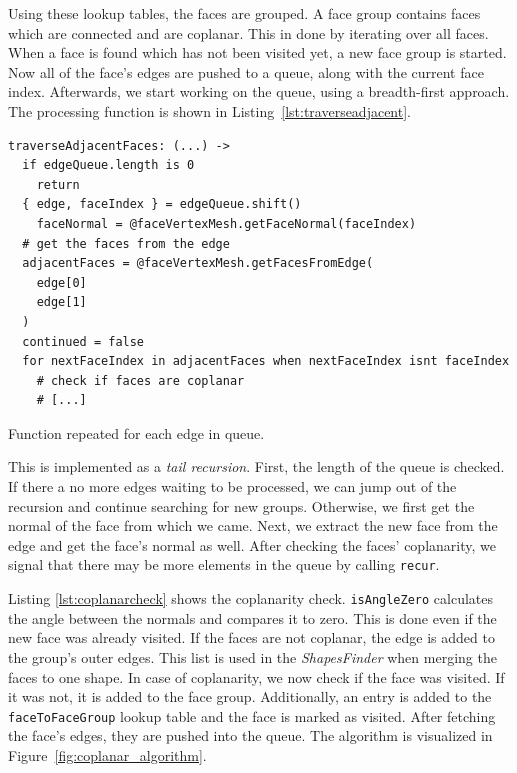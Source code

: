 \documentclass[../ClassicThesis.tex]{subfiles}
\begin{document}
Using these lookup tables, the faces are grouped. A face group contains faces which are connected and are coplanar. This in done by iterating over all faces. When a face is found which has not been visited yet, a new face group is started. Now all of the face's edges are pushed to a queue, along with the current face index. Afterwards, we start working on the queue, using a breadth-first approach. The processing function is shown in Listing~\ref{lst:traverseadjacent}.

\begin{listing}
\begin{verbatim}
traverseAdjacentFaces: (...) ->
  if edgeQueue.length is 0
    return
  { edge, faceIndex } = edgeQueue.shift()
    faceNormal = @faceVertexMesh.getFaceNormal(faceIndex)
  # get the faces from the edge
  adjacentFaces = @faceVertexMesh.getFacesFromEdge(
    edge[0]
    edge[1]
  )
  continued = false
  for nextFaceIndex in adjacentFaces when nextFaceIndex isnt faceIndex
    # check if faces are coplanar
    # [...]
\end{verbatim}
\caption{Function repeated for each edge in queue.}
\label{lst:traverseadjacent}
\end{listing}

This is implemented as a \emph{tail recursion}. First, the length of the queue is checked. If there a no more edges waiting to be processed, we can jump out of the recursion and continue searching for new groups. Otherwise, we first get the normal of the face from which we came. Next, we extract the new face from the edge and get the face's normal as well. After checking the faces' coplanarity, we signal that there may be more elements in the queue by calling \texttt{recur}.

Listing \ref{lst:coplanarcheck} shows the coplanarity check. \texttt{isAngleZero} calculates the angle between the normals and compares it to zero. This is done even if the new face was already visited. If the faces are not coplanar, the edge is added to the group's outer edges. This list is used in the \emph{ShapesFinder} when merging the faces to one shape. In case of coplanarity, we now check if the face was visited. If it was not, it is added to the face group. Additionally, an entry is added to the \texttt{faceToFaceGroup} lookup table and the face is marked as visited. After fetching the face's edges, they are pushed into the queue. The algorithm is visualized in Figure~\ref{fig:coplanar_algorithm}.
\end{document}
